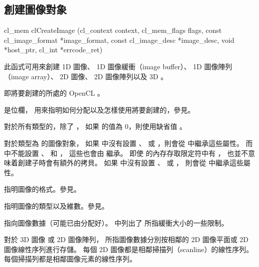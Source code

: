 \subsection{創建圖像對象}


\startCLFUNC
cl_mem clCreateImage (cl_context context,
		cl_mem_flags flags,
		const cl_image_format *image_format,
		const cl_image_desc *image_desc,
		void *host_ptr,
		cl_int *errcode_ret)
\stopCLFUNC

此函式可用來創建 1D 圖像、 1D 圖像緩衝（image buffer）、 1D 圖像陣列（image array）、
2D 圖像、 2D 圖像陣列以及 3D 。

 即將要創建的所處的 OpenCL 。

 是位欄，
用來指明如何分配以及怎樣使用將要創建的，參見。

對於所有類型的，除了 ，
如果  的值為 0，則使用缺省值 。

對於類型為  的圖像對象，
如果  中沒有設置 、 
或 ，則會從  中繼承這些屬性。
而  中不能設置 、
 和 ，
這些也會由  繼承。
即使  的內存存取限定符中有 ，
也並不意味着創建子時會有額外的拷貝。
如果  中沒有設置 、
 或 ，
則會從  中繼承這些屬性。

 指明圖像的格式。參見。

 指明圖像的類型以及維數。參見。

 指向圖像數據（可能已由分配好）。
中列出了  所指緩衝大小的一些限制。

{}

對於 3D 圖像 或 2D 圖像陣列，
 所指圖像數據分別按相鄰的 2D 圖像平面或 2D 圖像線性序列進行存儲。
每個 2D 圖像都是相鄰掃描列（scanline）的線性序列。
每個掃描列都是相鄰圖像元素的線性序列。

